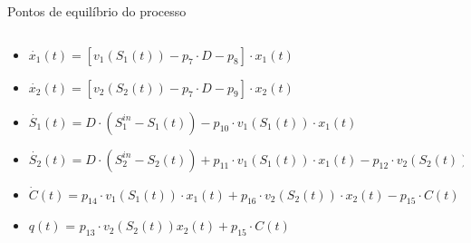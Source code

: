 \documentclass[10pt]{beamer}
\begin{document}
\begin{frame}[fragile]{Pontos de equilíbrio do processo}
\begin{columns}
\begin{column}{0.5\textwidth}
\begin{footnotesize}
\begin{itemize}[<+- | alert@+>]
\item $\dot{x_{1}}(t)=[v_{1}(S_{1}(t))-p_7 \cdot D - p_8]\cdot x_1(t)$\\
\item $\dot{x_{2}}(t)=[v_{2}(S_{2}(t))-p_7 \cdot D - p_9]\cdot x_2(t)$\\
\item $\dot{S_{1}}(t)=D\cdot(S_{1}^{in} - S_{1}(t)) - p_{10} \cdot v_{1}(S_{1}(t))\cdot x_1(t)$\\
\item $\dot{S_{2}}(t)=D \cdot (S_{2}^{in} - S_{2}(t)) + p_{11}\cdot v_{1}(S_{1}(t)) \cdot x_1(t) - p_{12} \cdot v_{2}(S_{2}(t)) \cdot x_2(t) $\\
\item $\dot{C}(t)= p_{14} \cdot v_{1}(S_{1}(t)) \cdot {x_{1}}(t) + p_{16} \cdot v_{2}(S_{2}(t)) \cdot {x_{2}}(t) - p_{15} \cdot C(t) $\\
\item $q(t)$ = $p_{13}\cdot v_{2}(S_{2}(t))x_2(t) + p_{15}\cdot C(t)$ \\
\end{itemize}
\end{footnotesize}
\end{column}
\end{columns}

\end{frame}
\end{document}
